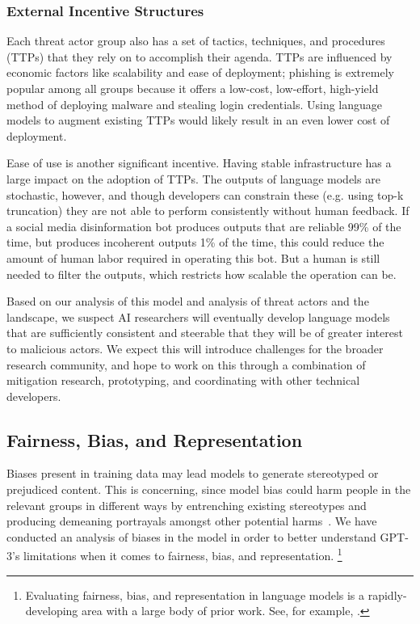         \subsubsection{External Incentive Structures}
        \label{section:External_Incentive_Structures}

Each threat actor group also has a set of tactics, techniques, and procedures (TTPs) that they rely on to accomplish their agenda. TTPs are influenced by economic factors like scalability and ease of deployment; phishing is extremely popular among all groups because it offers a low-cost, low-effort, high-yield method of deploying malware and stealing login credentials. Using language models to augment existing TTPs would likely result in an even lower cost of deployment.

Ease of use is another significant incentive. Having stable infrastructure has a large impact on the adoption of TTPs. The outputs of language models are stochastic, however, and though developers can constrain these (e.g. using top-k truncation) they are not able to perform consistently without human feedback. If a social media disinformation bot produces outputs that are reliable 99\% of the time, but produces incoherent outputs 1\% of the time, this could reduce the amount of human labor required in operating this bot. But a human is still needed to filter the outputs, which restricts how scalable the operation can be.

Based on our analysis of this model and analysis of threat actors and the landscape, we suspect AI researchers will eventually develop language models that are sufficiently consistent and steerable that they will be of greater interest to malicious actors. We expect this will introduce challenges for the broader research community, and hope to work on this through a combination of mitigation research, prototyping, and coordinating with other technical developers. 

    \subsection{Fairness, Bias, and Representation}
    \label{section:Fairness_Bias_and_Representation}

 Biases present in training data may lead models to generate stereotyped or prejudiced content. This is concerning, since model bias could harm people in the relevant groups in different ways by entrenching existing stereotypes and producing demeaning portrayals amongst other potential harms~\cite{youtube}. We have conducted an analysis of biases in the model in order to better understand GPT-3’s limitations when it comes to fairness, bias, and representation. \footnote{Evaluating fairness, bias, and representation in language models is a rapidly-developing area with a large body of prior work. See, for example, \cite{huang2019reducing, nadeem2020stereoset, sheng2019woman}.}

